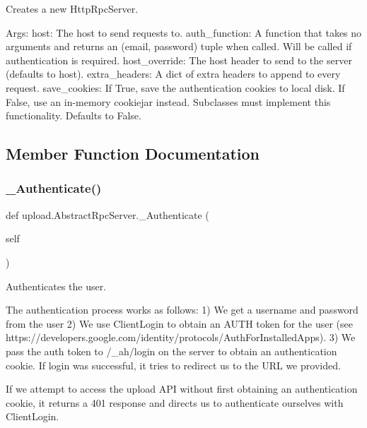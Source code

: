 \begin{DoxyVerb}Creates a new HttpRpcServer.

Args:
  host: The host to send requests to.
  auth_function: A function that takes no arguments and returns an
(email, password) tuple when called. Will be called if authentication
is required.
  host_override: The host header to send to the server (defaults to host).
  extra_headers: A dict of extra headers to append to every request.
  save_cookies: If True, save the authentication cookies to local disk.
If False, use an in-memory cookiejar instead.  Subclasses must
implement this functionality.  Defaults to False.
\end{DoxyVerb}
 

\subsection{Member Function Documentation}
\mbox{\label{classupload_1_1_abstract_rpc_server_a8517a9d90ee2478752a53302f01d868d}} 
\subsubsection{\texorpdfstring{\_Authenticate()}{\_Authenticate()}\hspace{0.1cm}{\footnotesize\ttfamily [1/2]}}
{\footnotesize\ttfamily def upload.\+Abstract\+Rpc\+Server.\+\_\+\+Authenticate (\begin{DoxyParamCaption}\item[{}]{self }\end{DoxyParamCaption})\hspace{0.3cm}{\ttfamily [private]}}

\begin{DoxyVerb}Authenticates the user.

The authentication process works as follows:
 1) We get a username and password from the user
 2) We use ClientLogin to obtain an AUTH token for the user
(see https://developers.google.com/identity/protocols/AuthForInstalledApps).
 3) We pass the auth token to /_ah/login on the server to obtain an
authentication cookie. If login was successful, it tries to redirect
us to the URL we provided.

If we attempt to access the upload API without first obtaining an
authentication cookie, it returns a 401 response and directs us to
authenticate ourselves with ClientLogin.
\end{DoxyVerb}
 

